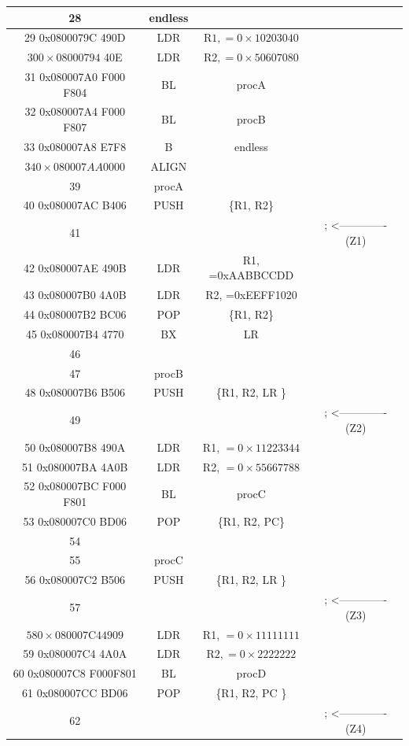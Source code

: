 \begin{center}
\begin{tabular}{|c|c|c|c|}
\hline
28 & endless &  &  \\
\hline
29 0x0800079C 490D & LDR & $\mathrm{R} 1,=0 \times 10203040$ &  \\
\hline
$300 \times 0800079 \mathrm{4}$ 40E & LDR & $\mathrm{R} 2,=0 \times 50607080$ &  \\
\hline
31 0x080007A0 F000 F804 & BL & procA &  \\
\hline
32 0x080007A4 F000 F807 & BL & procB &  \\
\hline
33 0x080007A8 E7F8 & B & endless &  \\
\hline
$340 \times 080007 A A 0000$ & ALIGN &  &  \\
\hline
39 & procA &  &  \\
\hline
40 0x080007AC B406 & PUSH & \{R1, R2\} &  \\
\hline
41 &  &  & ; <------------- (Z1) \\
\hline
42 0x080007AE 490B & LDR & R1, =0xAABBCCDD &  \\
\hline
43 0x080007B0 4A0B & LDR & R2, =0xEEFF1020 &  \\
\hline
44 0x080007B2 BC06 & POP & \{R1, R2\} &  \\
\hline
45 0x080007B4 4770 & BX & LR &  \\
\hline
46 &  &  &  \\
\hline
47 & procB &  &  \\
\hline
48 0x080007B6 B506 & PUSH & \{R1, R2, LR \} &  \\
\hline
49 &  &  & ; <------------- (Z2) \\
\hline
50 0x080007B8 490A & LDR & R1, $=0 \times 11223344$ &  \\
\hline
51 0x080007BA 4A0B & LDR & R2, $=0 \times 55667788$ &  \\
\hline
52 0x080007BC F000 F801 & BL & procC &  \\
\hline
53 0x080007C0 BD06 & POP & \{R1, R2, PC\} &  \\
\hline
54 &  &  &  \\
\hline
55 & procC &  &  \\
\hline
56 0x080007C2 B506 & PUSH & \{R1, R2, LR \} &  \\
\hline
57 &  &  & ; <------------- (Z3) \\
\hline
$580 \times 080007 \mathrm{C} 44909$ & LDR & R1, $=0 \times 11111111$ &  \\
\hline
59 0x080007C4 4A0A & LDR & $\mathrm{R} 2,=0 \times 2222222$ &  \\
\hline
60 0x080007C8 F000F801 & BL & procD &  \\
\hline
61 0x080007CC BD06 & POP & \{R1, R2, PC \} &  \\
\hline
62 &  &  & ; <------------- (Z4) \\
\hline
\end{tabular}
\end{center}

